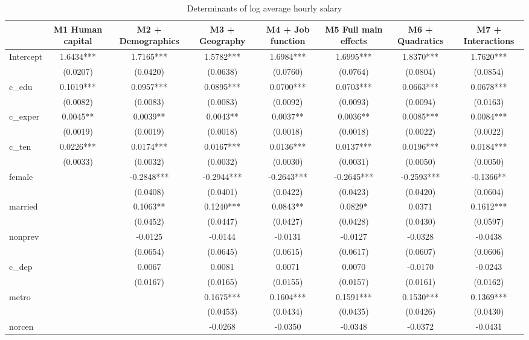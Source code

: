 \begin{table}[htbp]
\centering
\caption{Determinants of log average hourly salary}
\label{tab:main}
\begin{tabular}{lccccccc}
\hline\hline
 & M1 Human capital & M2 + Demographics & M3 + Geography & M4 + Job function & M5 Full main effects & M6 + Quadratics & M7 + Interactions \\
\hline
Intercept & 1.6434*** & 1.7165*** & 1.5782*** & 1.6984*** & 1.6995*** & 1.8370*** & 1.7620*** \\
 & (0.0207) & (0.0420) & (0.0638) & (0.0760) & (0.0764) & (0.0804) & (0.0854) \\
c\_edu & 0.1019*** & 0.0957*** & 0.0895*** & 0.0700*** & 0.0703*** & 0.0663*** & 0.0678*** \\
 & (0.0082) & (0.0083) & (0.0083) & (0.0092) & (0.0093) & (0.0094) & (0.0163) \\
c\_exper & 0.0045** & 0.0039** & 0.0043** & 0.0037** & 0.0036** & 0.0085*** & 0.0084*** \\
 & (0.0019) & (0.0019) & (0.0018) & (0.0018) & (0.0018) & (0.0022) & (0.0022) \\
c\_ten & 0.0226*** & 0.0174*** & 0.0167*** & 0.0136*** & 0.0137*** & 0.0196*** & 0.0184*** \\
 & (0.0033) & (0.0032) & (0.0032) & (0.0030) & (0.0031) & (0.0050) & (0.0050) \\
female &  & -0.2848*** & -0.2944*** & -0.2643*** & -0.2645*** & -0.2593*** & -0.1366** \\
 &  & (0.0408) & (0.0401) & (0.0422) & (0.0423) & (0.0420) & (0.0604) \\
married &  & 0.1063** & 0.1240*** & 0.0843** & 0.0829* & 0.0371 & 0.1612*** \\
 &  & (0.0452) & (0.0447) & (0.0427) & (0.0428) & (0.0430) & (0.0597) \\
nonprev &  & -0.0125 & -0.0144 & -0.0131 & -0.0127 & -0.0328 & -0.0438 \\
 &  & (0.0654) & (0.0645) & (0.0615) & (0.0617) & (0.0607) & (0.0606) \\
c\_dep &  & 0.0067 & 0.0081 & 0.0071 & 0.0070 & -0.0170 & -0.0243 \\
 &  & (0.0167) & (0.0165) & (0.0155) & (0.0157) & (0.0161) & (0.0162) \\
metro &  &  & 0.1675*** & 0.1604*** & 0.1591*** & 0.1530*** & 0.1369*** \\
 &  &  & (0.0453) & (0.0434) & (0.0435) & (0.0426) & (0.0430) \\
norcen &  &  & -0.0268 & -0.0350 & -0.0348 & -0.0372 & -0.0431 \\

\end{tabular}
\end{table}

